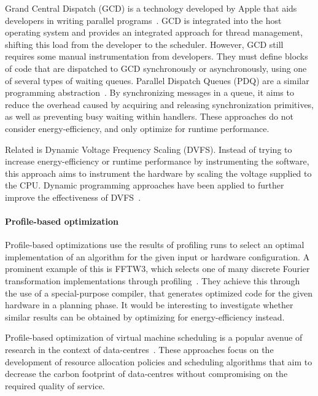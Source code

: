 \documentclass[runningheads]{llncs}
\begin{document}
Grand Central Dispatch (GCD) is a technology developed by Apple that aids developers in writing parallel programs~\cite{geeraerts2013queue,nutting2014grand,sakamoto2012grand}.
GCD is integrated into the host operating system and provides an integrated approach for thread management, shifting this load from the developer to the scheduler.
However, GCD still requires some manual instrumentation from developers.
They must define blocks of code that are dispatched to GCD synchronously or asynchronously, using one of several types of waiting queues.
Parallel Dispatch Queues (PDQ) are a similar programming abstraction~\cite{falsafi1999parallel}.
By synchronizing messages in a queue, it aims to reduce the overhead caused by acquiring and releasing synchronization primitives, as well as preventing busy waiting within handlers.
These approaches do not consider energy-efficiency, and only optimize for runtime performance.

Related is Dynamic Voltage Frequency Scaling (DVFS).
Instead of trying to increase energy-efficiency or runtime performance by instrumenting the software, this approach aims to instrument the hardware by scaling the voltage supplied to the CPU.
Dynamic programming approaches have been applied to further improve the effectiveness of DVFS~\cite{hajiamini2020dynamic}.

\paragraph{Profile-based optimization}
Profile-based optimizations use the results of profiling runs to select an optimal implementation of an algorithm for the given input or hardware configuration.
A prominent example of this is FFTW3, which selects one of many discrete Fourier transformation implementations through profiling~\cite{frigo2005design}.
They achieve this through the use of a special-purpose compiler, that generates optimized code for the given hardware in a planning phase.
It would be interesting to investigate whether similar results can be obtained by optimizing for energy-efficiency instead.

Profile-based optimization of virtual machine scheduling is a popular avenue of research in the context of data-centres~\cite{ding2017profile,buyya2010energy,dai2016energy,minarolli2011utility}.
These approaches focus on the development of resource allocation policies and scheduling algorithms that aim to decrease the carbon footprint of data-centres without compromising on the required quality of service.
\end{document}
